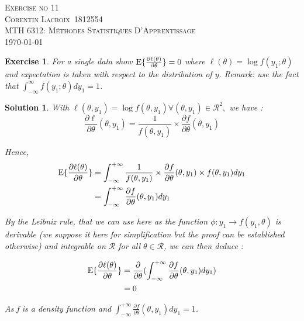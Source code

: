 \documentclass[12pt,a4paper]{article}
\def\StudentName{Corentin Lacroix}
\def\StudentMatricule{1812554}
\def\ExerciseNo{11}
\def\R{\mathcal{R}}%
\newtheorem{exercise}{Exercise}
\newtheorem{solution}{Solution}
\begin{document}
\begin{titlepage}
\begin{center}
\textsc{\LARGE Exercise no \ExerciseNo}\\[1.5cm]
\vspace{2in}
\textsc{\Large \StudentName~\StudentMatricule}\\[0.5cm]
\textsc{MTH 6312: Méthodes Statistiques D'Apprentissage}\\[0.5cm]
\today
\end{center}
\end{titlepage}

\begin{exercise}
For a single data show $\mathrm{E} \{ {\partial \ell(\theta)\over \partial \theta}\}=0$  where $\ell(\theta)=\log f(y_1;\theta)$  and expectation is taken with respect to the distribution of $y$. Remark: use the fact that $\int_{-\infty}^\infty f(y_1;\theta)d y_1=1$.
\end{exercise}
\begin{solution}

With $\ell(\theta, y_1) = \log f(\theta, y_1) \forall (\theta, y_1) \in \R^2,$ we have : 
$$\dfrac{\partial \ell}{\partial \theta} (\theta, y_1) = \frac{1}{f(\theta, y_1)} \times \frac{\partial f}{\partial \theta}(\theta, y_1) $$

Hence, 
\begin{equation}
\begin{split}
\mathrm{E} \{ {\partial \ell(\theta)\over \partial \theta}\} & = \int_{-\infty}^{+\infty} \frac{1}{f(\theta, y_1)} \times \frac{\partial f}{\partial \theta}(\theta, y_1) \times f(\theta, y_1) dy_1 \\
 & = \int_{-\infty}^{+\infty} \frac{\partial f}{\partial \theta}(\theta, y_1) dy_1
\end{split}
\end{equation}

By the Leibniz rule, that we can use here as the function $\phi : y_1 \longrightarrow f(y_1, \theta)$ is derivable (we suppose it here for simplification but the proof can be established otherwise) and integrable on $\R$ for all $\theta \in \R$, we can then deduce : 

\begin{equation}
\begin{split}
\mathrm{E} \{ {\partial \ell(\theta)\over \partial \theta}\} & = \frac{\partial}{\partial \theta} (\int_{-\infty}^{+\infty} \frac{\partial f}{\partial \theta}(\theta, y_1) dy_1) \\
 & = 0 \\
\end{split}
\end{equation}

As f is a density function and $\int_{-\infty}^{+\infty} \frac{\partial f}{\partial \theta}(\theta, y_1) dy_1 = 1$. 
\end{solution}
\end{document}
